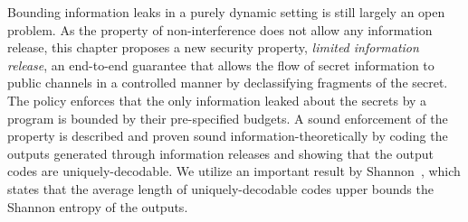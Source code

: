 Bounding information leaks in a purely dynamic setting is still largely 
an open problem. As the property of non-interference does not allow 
any information release, this chapter proposes a new security 
property, \emph{limited information release}, an end-to-end guarantee 
that allows the flow of secret information to public channels in a 
controlled manner by declassifying fragments of the secret. The 
policy enforces that the only information leaked about the secrets 
by a program is bounded by their pre-specified budgets. 
A sound enforcement of the property is described and proven sound 
information-theoretically by coding the outputs generated through
information releases and showing that the output codes are
uniquely-decodable. We utilize an important result by
Shannon~\cite{shannon}, which states  that the average length of
uniquely-decodable codes upper bounds the Shannon entropy of the
outputs. 







